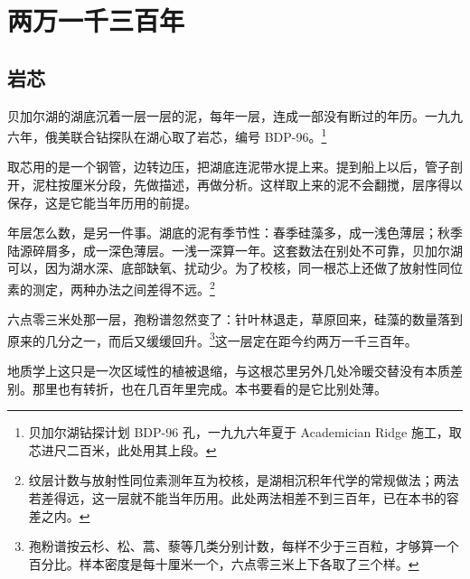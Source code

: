 \chapter{两万一千三百年}


\section{岩芯}

贝加尔湖的湖底沉着一层一层的泥，每年一层，连成一部没有断过的年历。一九九六年，俄美联合钻探队在湖心取了岩芯，编号 BDP-96。\footnote{贝加尔湖钻探计划 BDP-96 孔，一九九六年夏于 Academician Ridge 施工，取芯进尺二百米，此处用其上段。}

取芯用的是一个钢管，边转边压，把湖底连泥带水提上来。提到船上以后，管子剖开，泥柱按厘米分段，先做描述，再做分析。这样取上来的泥不会翻搅，层序得以保存，这是它能当年历用的前提。

年层怎么数，是另一件事。湖底的泥有季节性：春季硅藻多，成一浅色薄层；秋季陆源碎屑多，成一深色薄层。一浅一深算一年。这套数法在别处不可靠，贝加尔湖可以，因为湖水深、底部缺氧、扰动少。为了校核，同一根芯上还做了放射性同位素的测定，两种办法之间差得不远。\footnote{纹层计数与放射性同位素测年互为校核，是湖相沉积年代学的常规做法；两法若差得远，这一层就不能当年历用。此处两法相差不到三百年，已在本书的容差之内。}

六点零三米处那一层，孢粉谱忽然变了：针叶林退走，草原回来，硅藻的数量落到原来的几分之一，而后又缓缓回升。\footnote{孢粉谱按云杉、松、蒿、藜等几类分别计数，每样不少于三百粒，才够算一个百分比。样本密度是每十厘米一个，六点零三米上下各取了三个样。}这一层定在距今约两万一千三百年。

地质学上这只是一次区域性的植被退缩，与这根芯里另外几处冷暖交替没有本质差别。那里也有转折，也在几百年里完成。本书要看的是它比别处薄。

